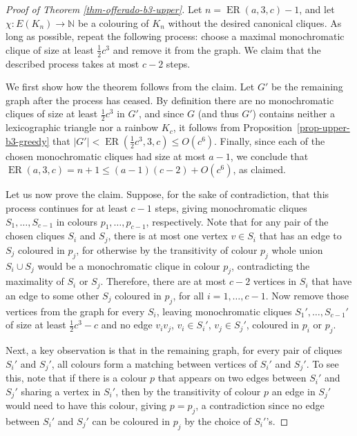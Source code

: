 \documentclass[11pt]{article}
\theoremstyle{plain}
\theoremstyle{definition}
\newcommand{\N}{\mathbb{N}}
\newcommand{\offerado}[3]{\operatorname{ER}(#1,#2,#3)}
\begin{document}
\begin{proof}[Proof of Theorem \ref{thm-offerado-b3-upper}]\sloppy
    Let $n=\offerado{a}{3}{c}-1$, and let $\chi:E(K_n)\to\N$ be a colouring of $K_n$ without the desired canonical cliques. As long as possible, repeat the following process: choose a maximal monochromatic clique of size at least $\frac{1}{2}c^3$ and remove it from the graph. We claim that the described process takes at most $c-2$ steps.

    We first show how the theorem follows from the claim. Let $G'$ be the remaining graph after the process has ceased. By definition there are no monochromatic cliques of size at least $\frac{1}{2}c^3$ in $G'$, and since $G$ (and thus $G'$) contains neither a lexicographic triangle nor a rainbow $K_c$, it follows from Proposition~\ref{prop-upper-b3-greedy} that $|G'|<\offerado{\frac{1}{2}c^3}{3}{c}\le O(c^6)$. Finally, since each of the chosen monochromatic cliques had size at most $a-1$, we conclude that $\offerado{a}{3}{c}=n+1\le (a-1)(c-2)+O(c^6)$, as claimed.

    Let us now prove the claim. Suppose, for the sake of contradiction, that this process continues for at least $c-1$ steps, giving monochromatic cliques $S_1,\dots,S_{c-1}$ in colours $p_1,\dots,p_{c-1}$, respectively. Note that for any pair of the chosen cliques $S_i$ and $S_j$, there is at most one vertex $v\in S_i$ that has an edge to $S_j$ coloured in $p_j$, for otherwise by the transitivity of colour $p_j$ whole union $S_i\cup S_j$ would be a monochromatic clique in colour $p_j$, contradicting the maximality of $S_i$ or $S_j$. Therefore, there are at most $c-2$ vertices in $S_i$ that have an edge to some other $S_j$ coloured in $p_j$, for all $i=1,\dots,c-1$. Now remove those vertices from the graph for every $S_i$, leaving monochromatic cliques $S_1',\dots,S_{c-1}'$ of size at least $\frac{1}{2}c^3-c$ and no edge $v_iv_j$, $v_i\in S_i'$, $v_j\in S_j'$, coloured in $p_i$ or $p_j$.

    Next, a key observation is that in the remaining graph, for every pair of cliques $S_i'$ and $S_j'$, all colours form a matching between vertices of $S_i'$ and $S_j'$. To see this, note that if there is a colour $p$ that appears on two edges between $S_i'$ and $S_j'$ sharing a vertex in $S_i'$, then by the transitivity of colour $p$ an edge in $S_j'$ would need to have this colour, giving $p=p_j$, a contradiction since no edge between $S_i'$ and $S_j'$ can be coloured in $p_j$ by the choice of $S_i'$'s.
    

\end{proof}
\end{document}
